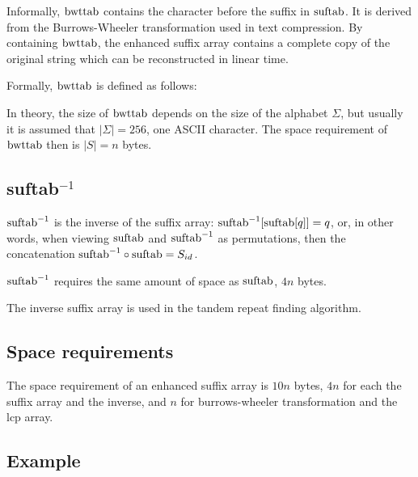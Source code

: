 \documentclass[a4paper,10pt]{article}
\begin{document}
Informally, $\hbox{bwttab}$ contains the character before the suffix in
$\hbox{suftab}$. It is derived from the Burrows-Wheeler transformation
used in text compression. %
By containing $\hbox{bwttab}$, the enhanced suffix array contains a
complete copy of the original string which can be reconstructed in
linear time.

Formally, $\hbox{bwttab}$ is defined as follows:



In theory, the size of $\hbox{bwttab}$ depends on the size of the alphabet
$\Sigma$, but usually it is assumed that $|\Sigma|=256$, one ASCII
character. The space requirement of $\hbox{bwttab}$ then is $|S|=n$ bytes.

\subsection*{suftab$^{-1}$}

$\hbox{suftab}^{-1}$ is the inverse of the suffix array:
$\hbox{suftab}^{-1}[\hbox{suftab}[q]]=q$, or, in other words, when
viewing $\hbox{suftab}$ and $\hbox{suftab}^{-1}$ as permutations, then
the concatenation $\hbox{suftab}^{-1} \circ \hbox{suftab}=S_{id}$.

$\hbox{suftab}^{-1}$ requires the same amount of space as $\hbox{suftab}$,
$4n$ bytes.

The inverse suffix array is used in the tandem repeat finding algorithm.

\subsection*{Space requirements}

The space requirement of an enhanced suffix array is $10n$ bytes, $4n$
for each the suffix array and the inverse, and $n$ for burrows-wheeler
transformation and the lcp array.

\subsection*{Example}
\end{document}

